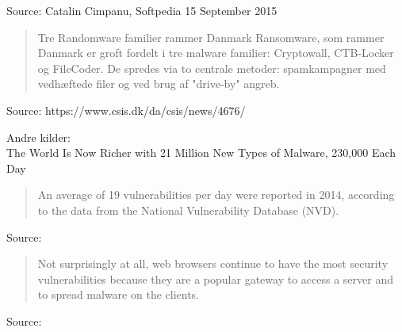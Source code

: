 \documentclass[20pt,landscape,a4paper,footrule]{foils}
\begin{document}
Source: Catalin Cimpanu, Softpedia 15 September 2015\\
{\footnotesize{}}



\begin{quote}
Tre Randomware familier rammer Danmark
Ransomware, som rammer Danmark er groft fordelt i tre malware familier: Cryptowall, CTB-Locker og FileCoder. De spredes via to centrale metoder: spamkampagner med vedhæftede filer og ved brug af "drive-by" angreb.
\end{quote}

Source:  https://www.csis.dk/da/csis/news/4676/

Andre kilder:\\
The World Is Now Richer with 21 Million New Types of Malware, 230,000 Each Day\\
{\tiny{}}




\begin{quote}
An average of 19 vulnerabilities per day were reported in 2014, according to the data from the National Vulnerability Database (NVD).
\end{quote}

Source:\\
{\footnotesize
{}}




\begin{quote}\small
Not surprisingly at all, web browsers continue to have the most security vulnerabilities because they are a popular gateway to access a server and to spread malware on the clients.
\end{quote}

Source:\\
{\footnotesize
{}}


\end{document}
